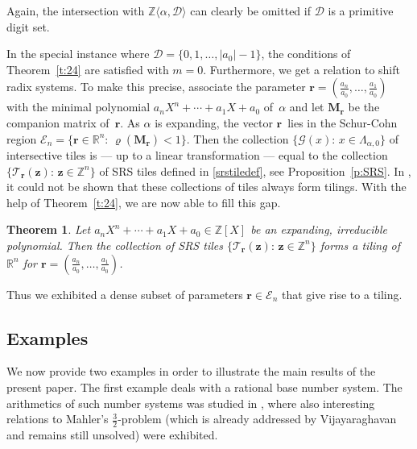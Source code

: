 \documentclass[12pt]{amsart}
\newtheorem{theorem}{Theorem}
\theoremstyle{definition}
\theoremstyle{remark}
\numberwithin{equation}{section}
\begin{document}
Again, the intersection with $\mathbb{Z}\langle \alpha, \mathcal{D}\rangle$ can clearly be omitted if $\mathcal{D}$ is a primitive digit set.

In the special instance where $\mathcal{D} = \{0,1,\ldots,|a_0|-1\}$, the conditions of Theorem~\ref{t:24} are satisfied with $m = 0$.
Furthermore, we get a relation to shift radix systems.
To make this precise, associate the parameter $\mathbf{r} = (\frac{a_n}{a_0},\ldots,\frac{a_1}{a_0})$ with the minimal polynomial $a_n X^n + \cdots + a_1 X + a_0$ of~$\alpha$ and let $\mathbf{M}_\mathbf{r}$ be the companion matrix of~$\mathbf{r}$.
As $\alpha$ is expanding, the vector $\mathbf{r}$~lies in the Schur-Cohn region $\mathcal{E}_n = \{\mathbf{r}\in\mathbb{R}^n:\, \varrho(\mathbf{M}_\mathbf{r}) < 1\}$.
Then the collection $\{\mathcal{G}(x):\, x \in \Lambda_{\alpha,0}\}$ of intersective tiles is --- up to a linear transformation --- equal to the collection $\{\mathcal{T}_\mathbf{r}(\mathbf{z}):\, \mathbf{z}\in \mathbb{Z}^n \}$ of SRS tiles defined in \eqref{srstiledef}, see Proposition~\ref{p:SRS}.
In \cite{BSSST:11}, it could not be shown that these collections of tiles always form tilings.
With the help of Theorem~\ref{t:24}, we are now able to fill this gap.

\begin{theorem} \label{srsthm}
Let $a_n X^n + \cdots + a_1 X + a_0 \in \mathbb{Z}[X]$ be an expanding, irreducible polynomial.
Then the collection of SRS tiles $\{\mathcal{T}_\mathbf{r}(\mathbf{z}):\, \mathbf{z}\in \mathbb{Z}^n\}$ forms a tiling of~$\mathbb{R}^n$ for $\mathbf{r} = (\frac{a_n}{a_0},\ldots,\frac{a_1}{a_0})$.
\end{theorem}

Thus we exhibited a dense subset of parameters $\mathbf{r}\in \mathcal{E}_n$ that give rise to a tiling.

\subsection*{Examples}
We now provide two examples in order to illustrate the main results of the present paper.
The first example deals with a rational base number system.
The arithmetics of such number systems was studied in \cite{Akiyama-Frougny-Sakarovitch:07}, where also interesting relations to Mahler's $\frac{3}{2}$-problem \cite{Mahler:68} (which is already addressed by Vijayaraghavan~\cite{Vijayaraghavan:40} and remains still unsolved) were exhibited.
\end{document}

